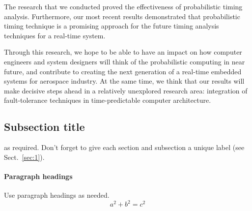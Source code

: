 The research that we conducted proved the effectiveness of probabilistic timing analysis. Furthermore, our most recent results demonstrated that probabilistic timing technique is a promising approach for the future timing analysis techniques for a real-time system.

Through this research, we hope to be able to have an impact on how computer engineers and system designers will think of the probabilistic computing in near future, and contribute to creating the next generation of a real-time embedded systems for aerospace industry. At the same time, we think that our results will make decisive steps ahead in a relatively unexplored research area: integration of fault-tolerance techniques in time-predictable computer architecture.
























































\subsection{Subsection title}
\label{sec:2}
as required. Don't forget to give each section
and subsection a unique label (see Sect.~\ref{sec:1}).
\paragraph{Paragraph headings} Use paragraph headings as needed.
\begin{equation}
a^2+b^2=c^2
\end{equation}

